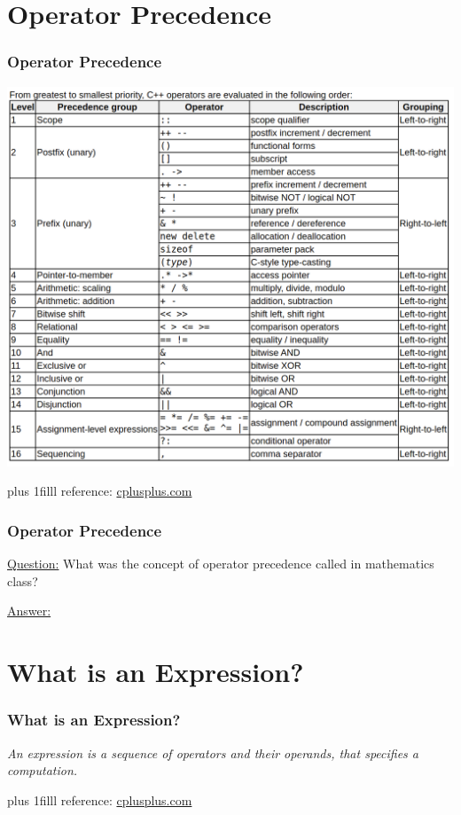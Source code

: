 \documentclass[fleqn]{beamer} %
\newcommand{\sectiontitleIII}{Operator Precedence}
\newcommand{\sectiontitleIV}{What is an Expression?}
\newcommand{\btVFill}{\vskip0pt plus 1filll}
\begin{document}
\section{\sectiontitleIII}

	\begin{frame}[label=sectionIII] \small
		\frametitle{\sectiontitleIII}
		
		\includegraphics[scale=.19]{operator_precedence.png}
		
		
		\btVFill
		\tiny{reference: \href{https://www.cplusplus.com/doc/tutorial/operators/}{cplusplus.com} } 
	\end{frame}

	\begin{frame} \small
		\frametitle{\sectiontitleIII}
		
		\underline{Question:} What was the concept of operator precedence called in mathematics class? \vspace{15mm}
		
		\underline{Answer:}
		
	\end{frame}


\section{\sectiontitleIV}	
	\begin{frame}[label=sectionIV] \small
		\frametitle{\sectiontitleIV}    
	
		\vspace{15mm}
	
		{\it An expression is a sequence of operators and their operands, that specifies a computation.}

		\btVFill
		\tiny{reference: \href{https://www.cplusplus.com/doc/tutorial/operators/}{cplusplus.com} } 
	\end{frame}
\end{document}
